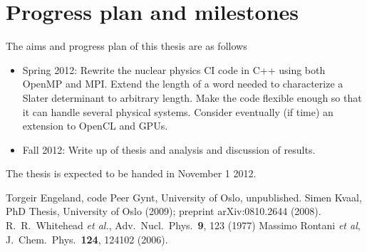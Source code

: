 \section*{Progress plan and milestones}
The aims and progress plan of this thesis are as follows
\begin{itemize}
\item Spring 2012: Rewrite the nuclear physics CI code in C++ using both OpenMP and MPI. Extend the 
length of a word needed to characterize a Slater determinant to arbitrary length.  
Make the code flexible enough so that it can handle several physical systems. 
Consider eventually (if time) an extension to OpenCL and GPUs.
 \item Fall 2012:  Write up of thesis and analysis and discussion of results. 
\end{itemize}
 


The thesis is expected to be handed in November 1 2012.

\begin{thebibliography}{999}
 Torgeir Engeland, code Peer Gynt, University of Oslo, unpublished.
  Simen Kvaal, PhD Thesis, University of Oslo (2009); preprint arXiv:0810.2644 (2008).
 R.~R.~Whitehead {\em et al.}, Adv.~Nucl.~Phys.~{\bf 9}, 123 (1977)
 Massimo Rontani {\em et al}, J.~Chem.~Phys.~{\bf 124}, 124102 (2006).

\end{thebibliography}







